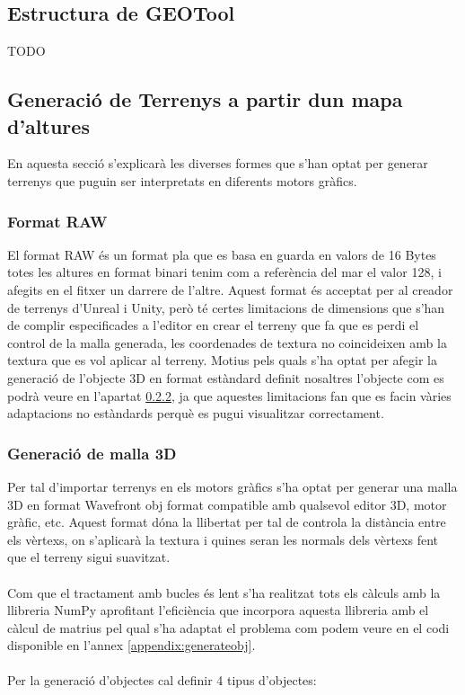 \documentclass[10pt,a4paper,twocolumn,twoside]{article}
\begin{document}
\subsection{Estructura de GEOTool}
{
\LARGE TODO
}
\subsection{Generació de Terrenys a partir dun mapa d'altures}
En aquesta secció s'explicarà les diverses formes que s'han optat per generar terrenys que puguin ser interpretats en diferents motors gràfics.

\subsubsection{Format RAW}
El format RAW és un format pla que es basa en guarda en valors de 16 Bytes totes les altures en format binari tenim com a referència del mar el valor 128, i afegits en el fitxer un darrere de l'altre. Aquest format és acceptat per al creador de terrenys d'Unreal i Unity, però té certes limitacions de dimensions que s'han de complir especificades a l'editor en crear el terreny que fa que es perdi el control de la malla generada, les coordenades de textura no coincideixen amb la textura que es vol aplicar al terreny. Motius pels quals s'ha optat per afegir la generació de l'objecte 3D en format estàndard definit nosaltres l'objecte com es podrà veure en l'apartat \ref{mesh3d}, ja que aquestes limitacions fan que es facin vàries adaptacions no estàndards perquè es pugui visualitzar correctament.

\subsubsection{Generació de malla 3D}
\label{mesh3d}
Per tal d'importar terrenys en els motors gràfics s'ha optat per generar una malla 3D en format Wavefront obj\cite{wavefrontobj} format compatible amb qualsevol editor 3D, motor gràfic, etc. Aquest format dóna la llibertat per tal de controla la distància entre els vèrtexs, on s'aplicarà la textura i quines seran les normals dels vèrtexs fent que el terreny sigui suavitzat.
\\
\\
Com que el tractament amb bucles és lent s'ha realitzat tots els càlculs amb la llibreria NumPy aprofitant l'eficiència que incorpora aquesta llibreria amb el càlcul de matrius pel qual s'ha adaptat el problema com podem veure en el codi disponible en l'annex \ref{appendix:generateobj}.
\\
\\
Per la generació d'objectes cal definir 4 tipus d'objectes:
\end{document}
